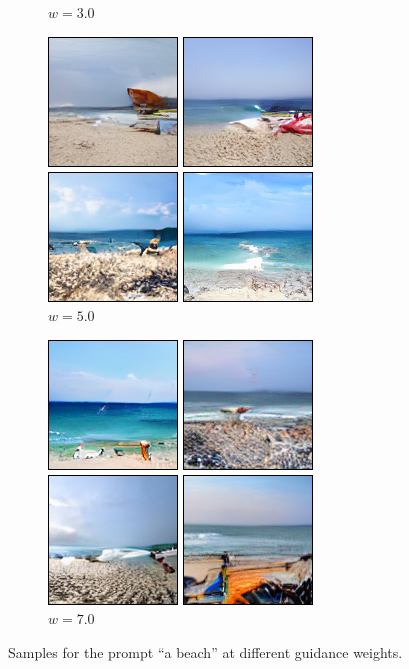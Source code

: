 \documentclass[11pt,a4paper]{article}
\begin{document}
\begin{figure}[!ht]
\begin{subfigure}[b]{0.24\textwidth}
\caption{$w=3.0$}
\end{subfigure}
\begin{subfigure}[b]{0.24\textwidth}
\includegraphics[width=\linewidth]{figures/a_beach_5.png}
\caption{$w=5.0$}
\end{subfigure}
\begin{subfigure}[b]{0.24\textwidth}
\includegraphics[width=\linewidth]{figures/a_beach_7.png}
\caption{$w=7.0$}
\end{subfigure}
\caption{Samples for the prompt ``a beach'' at different guidance weights.}
\end{figure}
\end{document}
